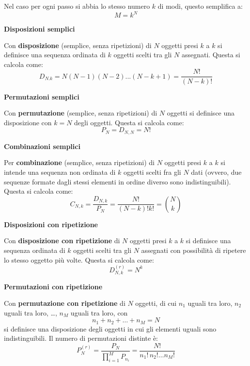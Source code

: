 \documentclass[a4paper,11pt]{article}
\begin{document}
Nel caso per ogni passo si abbia lo stesso numero $k$ di modi, questo semplifica a:
$$
M = k^N
$$

\newpage

\noindent
\textbf{\textsf{Disposizioni semplici}}

\noindent
Con \textbf{disposizione} (semplice, senza ripetizioni) di $N$ oggetti presi $k$ a $k$ si definisce una sequenza ordinata di $k$ oggetti scelti tra gli $N$ assegnati. Questa si calcola come:
$$
D_{N. k} = N (N - 1) (N - 2) ... (N - k + 1) = \frac{N!}{(N - k)!}
$$

\par\smallskip

\noindent
\textbf{\textsf{Permutazioni semplici}}

\noindent
Con \textbf{permutazione} (semplice, senza ripetizioni) di $N$ oggetti si definisce una disposizione con $k = N$ degli oggetti. Questa si calcola come:
$$
P_N = D_{N, N} = N!
$$

\par\smallskip

\noindent
\textbf{\textsf{Combinazioni semplici}}

\noindent
Per \textbf{combinazione} (semplice, senza ripetizioni) di $N$ oggetti presi $k$ a $k$ si intende una sequenza non ordinata di $k$ oggetti scelti fra gli $N$ dati (ovvero, due sequenze formate dagli stessi elementi in ordine diverso sono indistinguibili). Questa si calcola come:
$$
C_{N, k} = \frac{D_{N, k}}{P_N} = \frac{N!}{(N - k)! k!} = \binom{N}{k}
$$

\par\smallskip

\noindent
\textbf{\textsf{Disposizioni con ripetizione}}

\noindent
Con \textbf{disposizione con ripetizione} di $N$ oggetti presi $k$ a $k$ si definisce una sequenza ordinata di $k$ oggetti scelti tra gli $N$ assegnati con possibilità di ripetere lo stesso oggetto più volte. Questa si calcola come:
$$
D^{(r)}_{N,k} = N^k
$$

\par\smallskip

\noindent
\textbf{\textsf{Permutazioni con ripetizione}}

\noindent
Con \textbf{permutazione con ripetizione} di $N$ oggetti, di cui $n_1$ uguali tra loro, $n_2$ uguali tra loro, \dots, $n_M$ uguali tra loro, con
$$
n_1 + n_2 + \dots + n_M = N
$$
si definisce una disposizione degli oggetti in cui gli elementi uguali sono indistinguibili. Il numero di permutazioni distinte è:
$$
P^{(r)}_N = \frac{P_N}{ \prod_{i = 1}^M P_{n_i} } = \frac{N!}{n_1! \, n_2! \dots n_M!}
$$
\end{document}
